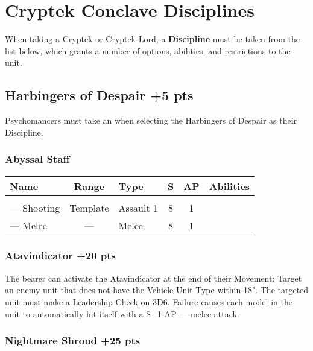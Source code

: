 \section{Cryptek Conclave Disciplines} \label{Cryptek Conclave Discipline}

When taking a Cryptek or Cryptek Lord, a \textbf{Discipline} must be taken from the list below, which grants a number of options, abilities, and restrictions to the unit.

\subsection[Harbingers of Despair ]{Harbingers of Despair  \hrulefill +5 pts}

Psychomancers must take an  when selecting the Harbingers of Despair as their Discipline.

\subsubsection{Abyssal Staff}

\label{Abyssal Staff}
\noindent
\begin{NiceTabular}{L{115 pt} c C{40pt} *{2}{c} >{\raggedright\arraybackslash}p{240pt}}
	Name & Range & Type & S & AP & Abilities \\
	\hline
	 &  &  &  &  & \\
	— Shooting & Template & Assault 1 & 8 & 1 &  \\
	— Melee & — & Melee & 8 & 1 &  \\
\end{NiceTabular}

\subsubsection[Atavindicator ]{Atavindicator  \hrulefill +20 pts}

The bearer can activate the Atavindicator at the end of their Movement: Target an enemy unit that does not have the Vehicle Unit Type within 18". The targeted unit must make a Leadership Check on 3D6. Failure causes each model in the unit to automatically hit itself with a S+1 AP — melee attack.

\subsubsection[Nightmare Shroud ]{Nightmare Shroud  \hrulefill +25 pts} 

